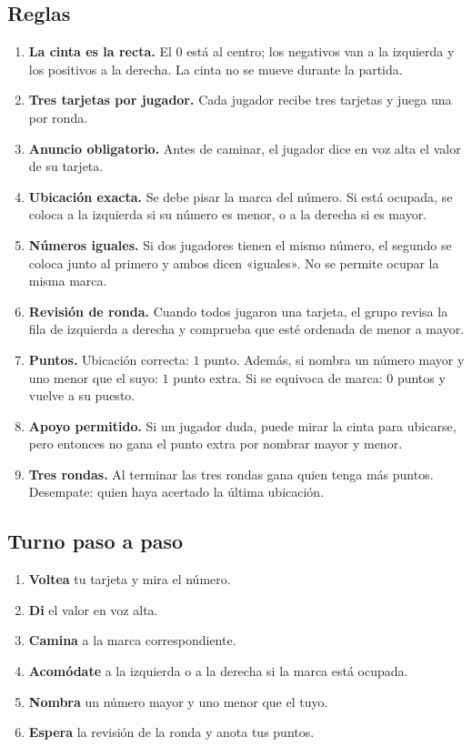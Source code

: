 \documentclass[12pt, letterpaper]{article}
\begin{document}
\subsection{Reglas}

\begin{enumerate}[leftmargin=*]
  \item \textbf{La cinta es la recta.} El $0$ está al centro; los negativos van a la izquierda y los positivos a la derecha. La cinta no se mueve durante la partida.
  \item \textbf{Tres tarjetas por jugador.} Cada jugador recibe tres tarjetas y juega una por ronda.
  \item \textbf{Anuncio obligatorio.} Antes de caminar, el jugador dice en voz alta el valor de su tarjeta.
  \item \textbf{Ubicación exacta.} Se debe pisar la marca del número. Si está ocupada, se coloca a la izquierda si su número es menor, o a la derecha si es mayor.
  \item \textbf{Números iguales.} Si dos jugadores tienen el mismo número, el segundo se coloca junto al primero y ambos dicen «iguales». No se permite ocupar la misma marca.
  \item \textbf{Revisión de ronda.} Cuando todos jugaron una tarjeta, el grupo revisa la fila de izquierda a derecha y comprueba que esté ordenada de menor a mayor.
  \item \textbf{Puntos.} Ubicación correcta: $1$ punto. Además, si nombra un número mayor y uno menor que el suyo: $1$ punto extra. Si se equivoca de marca: $0$ puntos y vuelve a su puesto.
  \item \textbf{Apoyo permitido.} Si un jugador duda, puede mirar la cinta para ubicarse, pero entonces no gana el punto extra por nombrar mayor y menor.
  \item \textbf{Tres rondas.} Al terminar las tres rondas gana quien tenga más puntos. Desempate: quien haya acertado la última ubicación.
\end{enumerate}

\subsection{Turno paso a paso}

\begin{enumerate}[leftmargin=*]
  \item \textbf{Voltea} tu tarjeta y mira el número.
  \item \textbf{Di} el valor en voz alta.
  \item \textbf{Camina} a la marca correspondiente.
  \item \textbf{Acomódate} a la izquierda o a la derecha si la marca está ocupada.
  \item \textbf{Nombra} un número mayor y uno menor que el tuyo.
  \item \textbf{Espera} la revisión de la ronda y anota tus puntos.
\end{enumerate}
\end{document}

